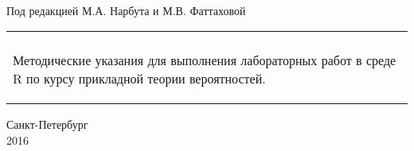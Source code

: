 \documentclass[a4paper,12pt]{article} %
\begin{document}
\begin{titlepage}

	\begin{center}

		\vspace{2cm}
		\\
		{\footnotesize Под редакцией М.А. Нарбута и М.В. Фаттаховой}
	\end{center} 

	\begin{center}
		\begin{tabular}{p{13cm}}
			\vspace{2cm}\\
			\begin{center}
				\vspace{1cm}
				\huge{Методические указания для выполнения лабораторных работ в среде R по курсу прикладной теории вероятностей.}
			\end{center}
		\end{tabular} 
	\end{center}

	\begin{center}
		\vspace{8cm}
		Санкт-Петербург\\
		2016
	\end{center}

\end{titlepage}


\tableofcontents 
\newpage








\end{document}
